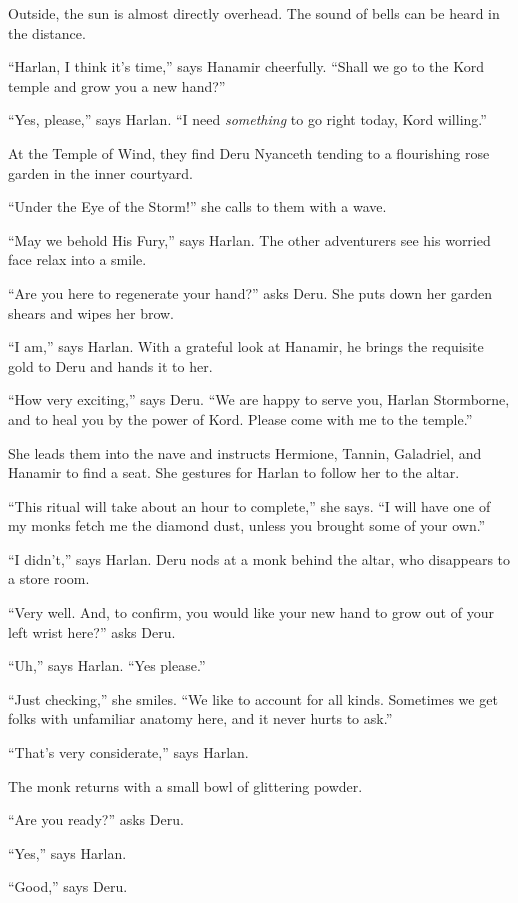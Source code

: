 \documentclass[smalldemyvopaper,11pt,twoside,onecolumn,openright,extrafontsizes]{memoir}
\begin{document}
Outside, the sun is almost directly overhead. The sound of bells can be
heard in the distance.

``Harlan, I think it's time,'' says Hanamir cheerfully. ``Shall we go to
the Kord temple and grow you a new hand?''

``Yes, please,'' says Harlan. ``I need \emph{something} to go right
today, Kord willing.''

At the Temple of Wind, they find Deru Nyanceth tending to a flourishing
rose garden in the inner courtyard.

``Under the Eye of the Storm!'' she calls to them with a wave.

``May we behold His Fury,'' says Harlan. The other adventurers see his
worried face relax into a smile.

``Are you here to regenerate your hand?'' asks Deru. She puts down her
garden shears and wipes her brow.

``I am,'' says Harlan. With a grateful look at Hanamir, he brings the
requisite gold to Deru and hands it to her.

``How very exciting,'' says Deru. ``We are happy to serve you, Harlan
Stormborne, and to heal you by the power of Kord. Please come with me to
the temple.''

She leads them into the nave and instructs Hermione, Tannin, Galadriel,
and Hanamir to find a seat. She gestures for Harlan to follow her to the
altar.

``This ritual will take about an hour to complete,'' she says. ``I will
have one of my monks fetch me the diamond dust, unless you brought some
of your own.''

``I didn't,'' says Harlan. Deru nods at a monk behind the altar, who
disappears to a store room.

``Very well. And, to confirm, you would like your new hand to grow out
of your left wrist here?'' asks Deru.

``Uh,'' says Harlan. ``Yes please.''

``Just checking,'' she smiles. ``We like to account for all kinds.
Sometimes we get folks with unfamiliar anatomy here, and it never hurts
to ask.''

``That's very considerate,'' says Harlan.

The monk returns with a small bowl of glittering powder.

``Are you ready?'' asks Deru.

``Yes,'' says Harlan.

``Good,'' says Deru.
\end{document}
